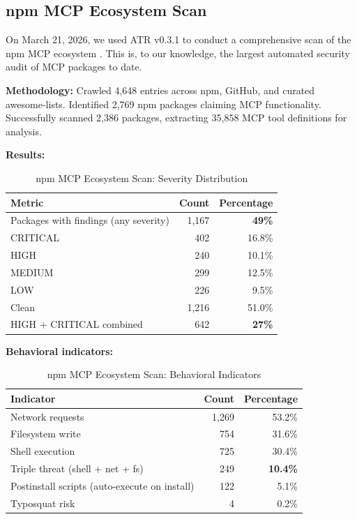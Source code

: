 \documentclass[11pt,letterpaper]{article}
\begin{document}
\subsection{npm MCP Ecosystem Scan}

On March 21, 2026, we used ATR v0.3.1 to conduct a comprehensive scan of the npm MCP ecosystem \cite{atrscan}. This is, to our knowledge, the largest automated security audit of MCP packages to date.

\textbf{Methodology:} Crawled 4,648 entries across npm, GitHub, and curated awesome-lists. Identified 2,769 npm packages claiming MCP functionality. Successfully scanned 2,386 packages, extracting 35,858 MCP tool definitions for analysis.

\textbf{Results:}

\begin{table}[htbp]
\centering
\caption{npm MCP Ecosystem Scan: Severity Distribution}
\label{tab:npmscan}
\begin{tabular}{lrr}
\toprule
\textbf{Metric} & \textbf{Count} & \textbf{Percentage} \\
\midrule
Packages with findings (any severity) & 1,167 & \textbf{49\%} \\
CRITICAL & 402 & 16.8\% \\
HIGH & 240 & 10.1\% \\
MEDIUM & 299 & 12.5\% \\
LOW & 226 & 9.5\% \\
Clean & 1,216 & 51.0\% \\
HIGH + CRITICAL combined & 642 & \textbf{27\%} \\
\bottomrule
\end{tabular}
\end{table}

\textbf{Behavioral indicators:}

\begin{table}[htbp]
\centering
\caption{npm MCP Ecosystem Scan: Behavioral Indicators}
\label{tab:npmbehavior}
\begin{tabular}{lrr}
\toprule
\textbf{Indicator} & \textbf{Count} & \textbf{Percentage} \\
\midrule
Network requests & 1,269 & 53.2\% \\
Filesystem write & 754 & 31.6\% \\
Shell execution & 725 & 30.4\% \\
Triple threat (shell + net + fs) & 249 & \textbf{10.4\%} \\
Postinstall scripts (auto-execute on install) & 122 & 5.1\% \\
Typosquat risk & 4 & 0.2\% \\
\bottomrule
\end{tabular}
\end{table}
\end{document}
